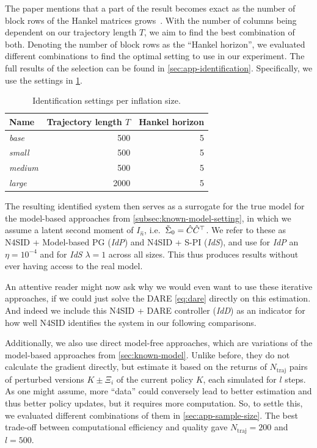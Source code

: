 The paper mentions that a part of the result becomes exact as the number of block rows of the Hankel matrices
grows~\cite[Sec.~5.3]{VanOverschee1994N4SID}. With the number of columns being dependent on our trajectory length $T$,
we aim to find the best combination of both. Denoting the number of block rows as the ``Hankel horizon'', we evaluated different
combinations to find the optimal setting to use in our experiment. The full results of the selection can be found in
\cref{sec:app-identification}. Specifically, we use the settings in
\cref{tab:identification-settings}.
\begin{table}[htbp]
    \centering
    \caption{Identification settings per inflation size.}
    \label{tab:identification-settings}
    \begin{tabular}{@{}lrr@{}}
        \toprule
        Name & Trajectory length $T$ & Hankel horizon \\
        \midrule
        \emph{base}   & 500  & 5 \\
        \emph{small}  & 500  & 5 \\
        \emph{medium} & 500  & 5 \\
        \emph{large}  & 2000 & 5 \\
        \bottomrule
    \end{tabular}
\end{table}

The resulting identified system then serves as a surrogate for the true model
for the model-based approaches from \cref{subsec:known-model-setting}, in which
we assume a latent second moment of $I_{\hat{n}}$, i.e.\ $\tilde{\Sigma}_0 = \hat{C}\hat{C}^{\top}$.
We refer to these as N4SID + Model-based PG (\emph{IdP}) and N4SID + S-PI (\emph{IdS}),
and use for \emph{IdP} an $\eta = 10^{-4}$ and for \emph{IdS}
$\lambda = 1$ across all sizes. This thus produces results without ever having
access to the real model.

An attentive reader might now ask why we would even want to use these iterative approaches, if we could just
solve the DARE \eqref{eq:dare} directly on this estimation. And indeed we include this N4SID + DARE
controller (\emph{IdD}) as an indicator for how well N4SID identifies the system in our following comparisons.

Additionally, we also use direct model-free approaches, which are variations of the model-based approaches
from \cref{sec:known-model}. Unlike before, they do not calculate the gradient directly, but estimate
it based on the returns of $N_{\mathrm{traj}}$ pairs of perturbed versions $K \pm \Xi_i$ of the current policy $K$, each simulated for $l$ steps. As one might
assume, more ``data'' could conversely lead to better estimation and thus better policy updates, but it requires more computation. So, to
settle this, we evaluated different combinations of them in \cref{sec:app-sample-size}. The best
trade-off between computational efficiency and quality gave $N_{\mathrm{traj}} = 200$ and $l = 500$.

